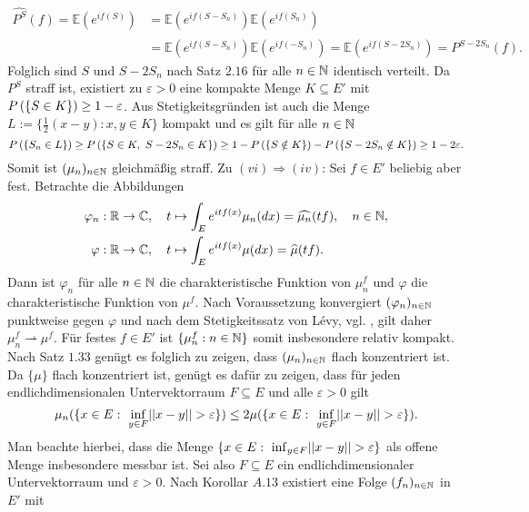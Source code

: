 \begin{proof*}
    \begin{align*}
        \widehat{P^S}(f) = \mathbb{E}(e^{if(S)}) &= \mathbb{E}(e^{if(S-S_n)})\mathbb{E}(e^{if(S_n)})  \\\
                                        &= \mathbb{E}(e^{if(S-S_n)})\mathbb{E}(e^{if(-S_n)}) = \mathbb{E}(e^{if(S-2S_n)}) = \widehat{P^{S-2S_n}}(f).
    \end{align*}
    Folglich sind $S$ und $S - 2S_n$ nach Satz $2.16$ für alle $n \in \mathbb{N}$  identisch verteilt. Da $P^S$ straff ist, existiert zu $\varepsilon >0$ eine kompakte Menge $K \subseteq E'$ mit $P\left(\left\{ S \in K \right\}\right) \geq 1 - \varepsilon$. 
    Aus Stetigkeitsgründen ist auch die Menge $L := \{\frac{1}{2}(x-y): x,y \in K\}$ kompakt und es gilt für alle $n \in \mathbb{N}$
    $$
        \prob{S_n \in L} \geq \prob{S \in K, \ S-2S_n \in K} \geq 1 - \prob{S \notin K} - \prob{S-2S_n \notin K} \geq 1 - 2\varepsilon. 
    $$ 
    Somit ist $(\mu_n)_{n \in \mathbb{N}}$ gleichmäßig straff. 
    \newline
    Zu $(vi) \Rightarrow (iv)$: 
    Sei $f \in E'$ beliebig aber fest. Betrachte die Abbildungen 
    \begin{align*}
        \varphi_n &: \mathbb{R} \to \mathbb{C}, \quad t \mapsto \int_E e^{itf(x)}\mu_n(dx) = \widehat{\mu_n}(tf), \quad n \in \mathbb{N}, \\\
        \varphi   &: \mathbb{R} \to \mathbb{C}, \quad t \mapsto \int_E e^{itf(x)}\mu(dx) = \widehat{\mu}(tf). 
    \end{align*}
    Dann ist $\varphi_n$ für alle $n \in \mathbb{N}$ die charakteristische Funktion von $\mu_n^{f}$ und $\varphi$ die charakteristische Funktion von $\mu^f$. Nach Voraussetzung konvergiert $(\varphi_n)_{n \in \mathbb{N}}$ punktweise gegen $\varphi$ und nach 
    dem Stetigkeitssatz von Lévy, vgl. \cite[Satz 8.7.5]{gs}, gilt daher $\mu_n^f \rightharpoonup \mu^f$. Für festes $f \in E'$ ist $\{\mu_n^f : n \in \mathbb{N}\}$ somit insbesondere relativ kompakt.
     Nach Satz $1.33$ genügt es folglich zu zeigen, dass $(\mu_n)_{n \in \mathbb{N}}$ flach konzentriert ist. 
    Da $\{\mu\}$ flach konzentriert ist, genügt es dafür zu zeigen, dass für jeden endlichdimensionalen Untervektorraum $F \subseteq E$ und alle $\varepsilon > 0$ gilt 
    $$
        \mu_n(\{x \in E: \ \inf_{y \in F}\lvert\lvert x-y \rvert\rvert > \varepsilon \}) \leq 2 \mu(\{x \in E: \ \inf_{y \in F}\lvert\lvert x-y \rvert\rvert > \varepsilon \}).
    $$
    Man beachte hierbei, dass die Menge $\{x \in E: \ \inf_{y \in F}\lvert\lvert x-y \rvert\rvert > \varepsilon \}$ als offene Menge insbesondere messbar ist. 
    Sei also $F \subseteq E$ ein endlichdimensionaler Untervektorraum und $\varepsilon >0$. Nach Korollar $A.13$ existiert eine Folge $(f_n)_{n \in \mathbb{N}}$ in $E'$ mit 

\end{proof*}
